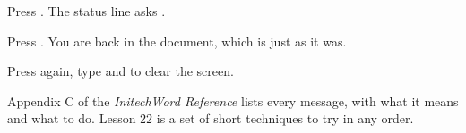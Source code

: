 \begin{WPSteps}
\item Press .  The status line asks .
\item Press .  You are back in the document, which is just
as it was.
\item Press  again, type  and  to
clear the screen.
\end{WPSteps}
\EndReplay
Appendix C of the \textit{InitechWord Reference} lists every message, with
what it means and what to do.  Lesson 22 is a set of short techniques to try
in any order.

